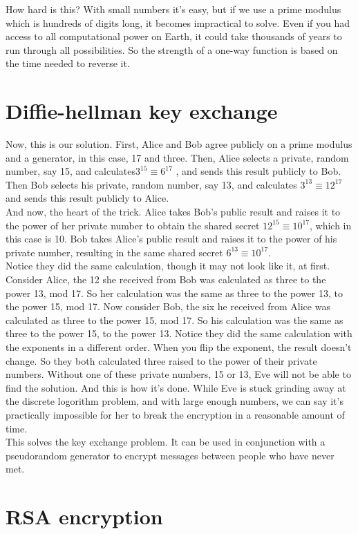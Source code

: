 \documentclass{report}
\begin{document}
How hard is this? With small numbers it's easy, but if we use a prime modulus which is hundreds of digits long, it becomes impractical to solve. Even if you had access to all computational power on Earth, it could take thousands of years to run through all possibilities. So the strength of a one-way function is based on the time needed to reverse it.
\section{Diffie-hellman key exchange}
Now, this is our solution. First, Alice and Bob agree publicly on a prime modulus and a generator, in this case, 17 and three. Then, Alice selects a private, random number, say 15, and calculates$3^{15} \equiv 6^{17}$ , and sends this result publicly to Bob. Then Bob selects his private, random number, say 13, and calculates $3^{13} \equiv 12^{17}$ and sends this result publicly to Alice.\\ 
And now, the heart of the trick. Alice takes Bob's public result and raises it to the power of her private number to obtain the shared secret $12^{15} \equiv 10^{17}$, which in this case is 10. Bob takes Alice's public result and raises it to the power of his private number, resulting in the same shared secret $6^{13} \equiv 10^{17}$.\\
Notice they did the same calculation, though it may not look like it, at first. Consider Alice, the 12 she received from Bob was calculated as three to the power 13, mod 17. So her calculation was the same as three to the power 13, to the power 15, mod 17. Now consider Bob, the six he received from Alice was calculated as three to the power 15, mod 17. So his calculation was the same as three to the power 15, to the power 13. Notice they did the same calculation with the exponents in a different order. When you flip the exponent, the result doesn't change. So they both calculated three raised to the power of their private numbers. Without one of these private numbers, 15 or 13, Eve will not be able to find the solution. And this is how it's done. While Eve is stuck grinding away at the discrete logorithm problem, and with large enough numbers, we can say it's practically impossible for her to break the encryption in a reasonable amount of time. \\
This solves the key exchange problem. It can be used in conjunction with a pseudorandom generator to encrypt messages between people who have never met.

\section{RSA encryption}
\end{document}
